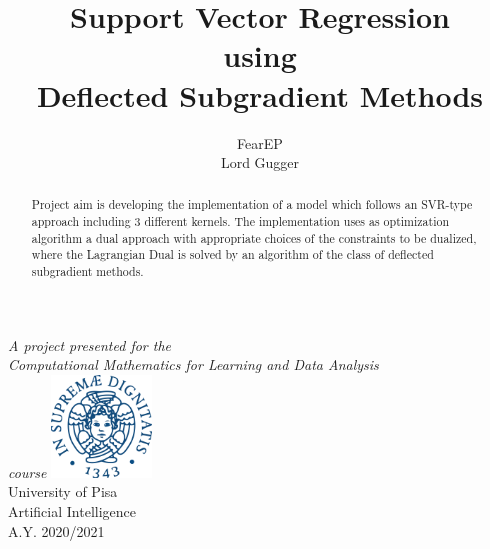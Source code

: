 \documentclass[12pt]{article}
\title{Support Vector Regression\\using\\Deflected Subgradient Methods}
\author{FearEP\\Lord Gugger}
\begin{document}
	\begin{titlepage}
		\maketitle
	   \begin{center}
		\vspace{0.5cm}
	        \textit{A project presented for the\\Computational Mathematics for Learning and Data Analysis\\course}
	       \vfill	     
	       \includegraphics[width=0.2\textwidth]{unipi.png}\\
	       University of Pisa\\
	       Artificial Intelligence\\
			A.Y. 2020/2021\\
	            
	   \end{center}
	\end{titlepage}
	
	\newpage
	\begin{abstract}
		 Project aim is developing the implementation of a model which follows an SVR-type approach including 3 different kernels. The implementation uses as optimization algorithm a dual approach with appropriate choices of the constraints to be dualized, where the Lagrangian Dual is solved by an algorithm of the class of deflected subgradient methods.
	\end{abstract}
	
\end{document}

